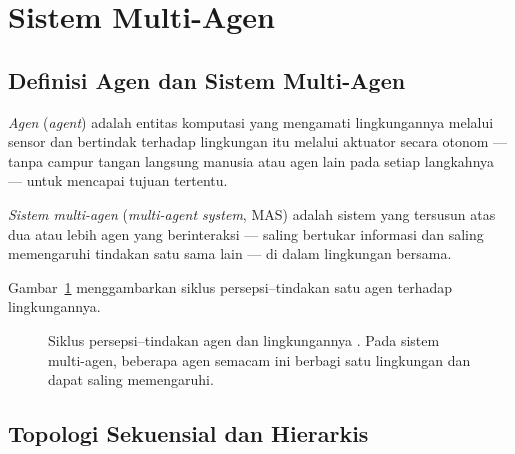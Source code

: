 \section{Sistem Multi-Agen}
\label{sec:multiagen}

\subsection{Definisi Agen dan Sistem Multi-Agen}
\label{subsec:agen}

\begin{definisi}
\label{def:agen}
\textit{Agen} (\textit{agent}) adalah entitas komputasi yang mengamati
lingkungannya melalui sensor dan bertindak terhadap lingkungan itu melalui
aktuator secara otonom --- tanpa campur tangan langsung manusia atau agen
lain pada setiap langkahnya --- untuk mencapai tujuan tertentu.
\end{definisi}

\begin{definisi}
\label{def:mas}
\textit{Sistem multi-agen} (\textit{multi-agent system}, MAS) adalah
sistem yang tersusun atas dua atau lebih agen yang berinteraksi --- saling
bertukar informasi dan saling memengaruhi tindakan satu sama lain --- di
dalam lingkungan bersama.
\end{definisi}

Gambar~\ref{fig:agen} menggambarkan siklus persepsi--tindakan satu agen
terhadap lingkungannya.

\begin{figure}[H]
\centering
{}
\caption{Siklus persepsi--tindakan agen dan lingkungannya
\citep{wooldridge2009}. Pada sistem multi-agen, beberapa agen semacam ini
berbagi satu lingkungan dan dapat saling memengaruhi.}
\label{fig:agen}
\end{figure}

\subsection{Topologi Sekuensial dan Hierarkis}
\label{subsec:topologi}

